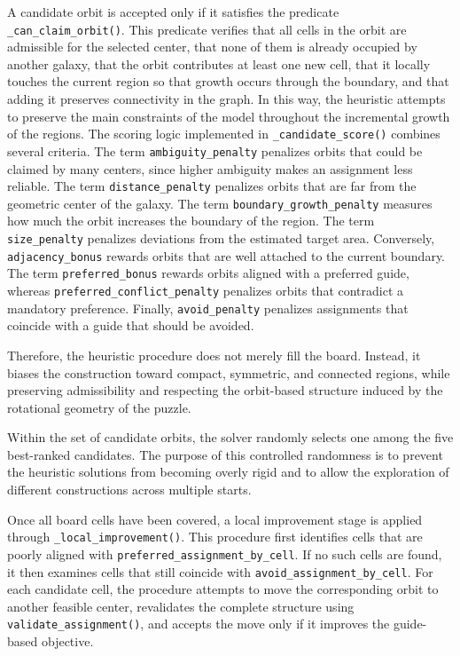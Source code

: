 A candidate orbit is accepted only if it satisfies the predicate \texttt{\_can\_claim\_orbit()}. This predicate verifies that all cells in the orbit are admissible for the selected center, that none of them is already occupied by another galaxy, that the orbit contributes at least one new cell, that it locally touches the current region so that growth occurs through the boundary, and that adding it preserves connectivity in the graph. In this way, the heuristic attempts to preserve the main constraints of the model throughout the incremental growth of the regions. The scoring logic implemented in \texttt{\_candidate\_score()} combines several criteria. The term \texttt{ambiguity\_penalty} penalizes orbits that could be claimed by many centers, since higher ambiguity makes an assignment less reliable. The term \texttt{distance\_penalty} penalizes orbits that are far from the geometric center of the galaxy. The term \texttt{boundary\_growth\_penalty} measures how much the orbit increases the boundary of the region. The term \texttt{size\_penalty} penalizes deviations from the estimated target area. Conversely, \texttt{adjacency\_bonus} rewards orbits that are well attached to the current boundary. The term \texttt{preferred\_bonus} rewards orbits aligned with a preferred guide, whereas \texttt{preferred\_conflict\_penalty} penalizes orbits that contradict a mandatory preference. Finally, \texttt{avoid\_penalty} penalizes assignments that coincide with a guide that should be avoided.

Therefore, the heuristic procedure does not merely fill the board. Instead, it biases the construction toward compact, symmetric, and connected regions, while preserving admissibility and respecting the orbit-based structure induced by the rotational geometry of the puzzle.

Within the set of candidate orbits, the solver randomly selects one among the five best-ranked candidates. The purpose of this controlled randomness is to prevent the heuristic solutions from becoming overly rigid and to allow the exploration of different constructions across multiple starts.

Once all board cells have been covered, a local improvement stage is applied through \texttt{\_local\_improvement()}. This procedure first identifies cells that are poorly aligned with \texttt{preferred\_assignment\_by\_cell}. If no such cells are found, it then examines cells that still coincide with \texttt{avoid\_assignment\_by\_cell}. For each candidate cell, the procedure attempts to move the corresponding orbit to another feasible center, revalidates the complete structure using \texttt{validate\_assignment()}, and accepts the move only if it improves the guide-based objective.

